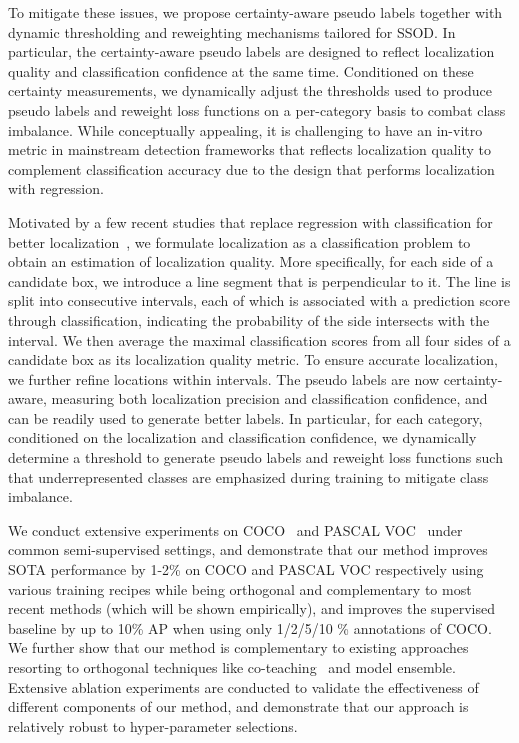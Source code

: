 \documentclass[letterpaper]{article} \usepackage{aaai22}  \usepackage{times}  \usepackage{helvet}  \usepackage{courier}  \usepackage[hyphens]{url}  \usepackage{graphicx} \urlstyle{rm} \def\UrlFont{\rm}  \usepackage{natbib}  \usepackage{caption} \DeclareCaptionStyle{ruled}{labelfont=normalfont,labelsep=colon,strut=off} \frenchspacing  \setlength{\pdfpagewidth}{8.5in}  \setlength{\pdfpageheight}{11in}  \usepackage{algorithm}
\begin{document}
To mitigate these issues, we propose certainty-aware pseudo labels together with dynamic thresholding and reweighting mechanisms tailored for SSOD. In particular, the certainty-aware pseudo labels are designed to reflect localization quality and classification confidence at the same time. Conditioned on these certainty measurements, we dynamically adjust the thresholds used to produce pseudo labels and reweight loss functions on a per-category basis to combat class imbalance. While conceptually appealing, it is challenging to have an in-vitro metric in mainstream detection frameworks that reflects localization quality to complement classification accuracy due to the design that performs localization with regression.

Motivated by a few recent studies that replace regression with classification for better localization~\cite{qiu2020offset,wang2020side}, we formulate localization as a classification problem to obtain an estimation of localization quality. More specifically, for each side of a candidate box,  we introduce a line segment that is perpendicular to it.  The line is split into consecutive intervals, each of which is associated with a prediction score through classification, indicating the probability of the side intersects with the interval. We then average the maximal classification scores from all four sides of a candidate box as its localization quality metric. To ensure accurate localization, we further refine locations within intervals. The pseudo labels are now certainty-aware, measuring both localization precision and classification confidence, and can be readily used to generate better labels. In particular, for each category, conditioned on the localization and classification confidence, we dynamically determine a threshold to generate pseudo labels and reweight loss functions such that underrepresented classes are emphasized during training to mitigate class imbalance.

We conduct extensive experiments on COCO~\cite{coco} and PASCAL VOC~\cite{voc} under common semi-supervised settings, and demonstrate that our method improves SOTA performance by 1-2\% on COCO and PASCAL VOC respectively using various training recipes while being orthogonal and complementary to most recent methods (which will be shown empirically), and improves the supervised baseline by up to 10\% AP when using only 1/2/5/10 \% annotations of COCO. We further show that our method is complementary to existing approaches resorting to orthogonal techniques like co-teaching~\cite{coteaching} and model ensemble. Extensive ablation experiments are conducted to validate the effectiveness of different components of our method, and demonstrate that our approach is relatively robust to hyper-parameter selections. 
\end{document}
